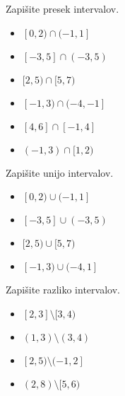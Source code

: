         
            \begin{naloga}
                Zapišite presek intervalov.
                \begin{itemize}
                    
                        \item $ [0,2)\cap(-1,1]$ 
                        \item $ [-3,5]\cap(-3,5)$ 
                        \item $ [2,5)\cap[5,7)$ 
                        \item $ [-1,3)\cap(-4,-1]$ 
                        \item $ [4,6]\cap[-1,4]$ 
                        \item $ (-1,3)\cap[1,2)$ 
                    

                \end{itemize}
            \end{naloga}
        


        
            \begin{naloga}
                Zapišite unijo intervalov.
                \begin{itemize}
                        \item $ [0,2)\cup(-1,1]$ 
                        \item $ [-3,5]\cup(-3,5)$ 
                        \item $ [2,5)\cup[5,7)$ 
                        \item $ [-1,3)\cup(-4,1]$ 
                \end{itemize}
            \end{naloga}
        


        
        
            \begin{naloga}
                Zapišite razliko intervalov.
                \begin{itemize}
                        \item $ [2,3]\setminus[3,4)$ 
                        \item $ (1,3)\setminus(3,4)$ 
                        \item $ [2,5)\setminus(-1,2]$ 
                        \item $ (2,8)\setminus[5,6)$ 
                \end{itemize}
            \end{naloga}
        


